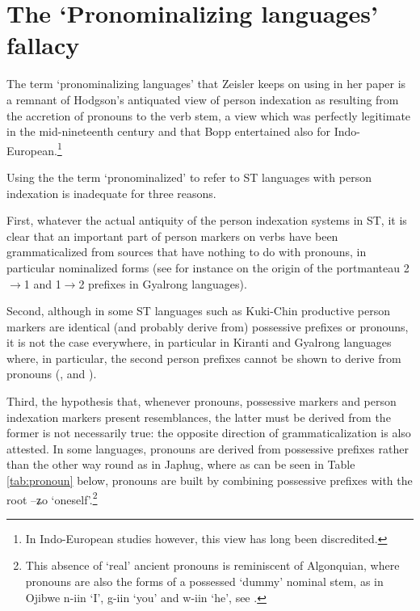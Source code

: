 \documentclass[oldfontcommands,oneside,a4paper,11pt]{article}
\newcommand{\ipa}[1]{{\phon \mbox{#1}}} %
\begin{document}
\section{The `Pronominalizing languages' fallacy}
The term `pronominalizing languages' that Zeisler keeps on using in her paper is a remnant of Hodgson's antiquated view of person indexation as resulting from the accretion of pronouns to the verb stem, a view which was perfectly legitimate in the mid-nineteenth century and that Bopp entertained also for Indo-European.\footnote{In Indo-European studies however, this view has long been discredited. }

Using the the term `pronominalized' to refer to ST languages with person indexation is inadequate for three reasons.

First, whatever the actual antiquity of the person indexation systems in ST, it is clear that an important part of person markers on verbs have been grammaticalized from sources that have nothing to do with pronouns, in particular nominalized forms (see for instance \citealt{jacques15generic} on the origin of the portmanteau 2$\rightarrow$1 and 1$\rightarrow$2 prefixes in Gyalrong languages).

Second, although in some ST languages such as Kuki-Chin productive person markers are identical (and probably derive from) possessive prefixes or pronouns, it is not the case everywhere, in particular in Kiranti and Gyalrong languages where, in particular, the second person prefixes cannot be shown to derive from pronouns (\citealt{jacques12agreement}, \citealt{delancey11prefixes} and \citealt{delancey14second}).

Third, the hypothesis that, whenever pronouns, possessive markers and person indexation markers present resemblances, the latter must be derived from the former is not necessarily true: the opposite direction of grammaticalization is also attested. In some languages, pronouns are derived from possessive prefixes rather than the other way round as in Japhug, where as can be seen in Table \ref{tab:pronoun} below, pronouns are built by combining possessive prefixes with the root \ipa{--ʑo} `oneself'.\footnote{This absence of `real' ancient pronouns is reminiscent of Algonquian, where pronouns are also the forms of a possessed `dummy' nominal stem, as in Ojibwe \ipa{n-iin} `I', \ipa{g-iin} `you' and \ipa{w-iin} `he', see \citet{valentine01grammar}. }
\end{document}
